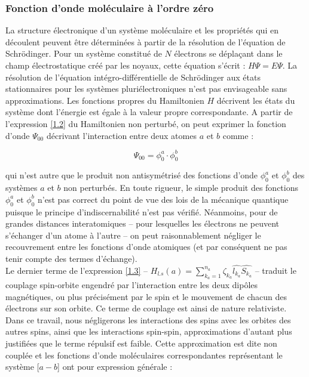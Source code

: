 \documentclass[12pt,a4paper]{book}
\begin{document}
		
	
	\subsubsection{Fonction d'onde moléculaire à l'ordre zéro}
	
	La structure électronique d'un système moléculaire et les propriétés qui en découlent peuvent être déterminées à partir de la résolution de l'équation de Schr\"{o}dinger. Pour un système constitué de $N$ électrons se déplaçant dans le champ électrostatique créé par les noyaux, cette équation s'écrit : $H\Psi = E\Psi$. La résolution de l'équation intégro-différentielle de Schr\"{o}dinger aux états stationnaires pour les systèmes pluriélectroniques n'est pas envisageable sans approximations. Les fonctions propres du Hamiltonien $H$ décrivent les états du système dont l'énergie est égale à la valeur propre correspondante. A partir de l'expression \ref{1.2} du Hamiltonien non perturbé, on peut exprimer la fonction d'onde $\Psi_{00}$ décrivant l'interaction entre deux atomes $a$ et $b$ comme : 
	
	\begin{equation}
	\Psi_{00} = \phi_{0}^{a} \cdot \phi_{0}^{b}
	\end{equation}
	
	\noindent qui n'est autre que le produit non antisymétrisé des fonctions d'onde $\phi_{0}^{a}$ et $\phi_{0}^{b}$ des systèmes $a$ et $b$ non perturbés. En toute rigueur, le simple produit des fonctions $\phi_{0}^{a}$ et $\phi_{0}^{b}$ n'est pas correct du point de vue des lois de la mécanique quantique puisque le principe d'indiscernabilité n'est pas vérifié. Néanmoins, pour de grandes distances interatomiques -- pour lesquelles les électrons ne peuvent s'échanger d'un atome à l'autre -- on peut raisonnablement négliger le recouvrement entre les fonctions d'onde atomiques (et par conséquent ne pas tenir compte des termes d'échange).\\
	
	Le dernier terme de l'expression \ref{1.3} -- $H_{l.s}(a) = \sum_{k_{a}=1}^{n_{a}} \zeta_{k_{a}} \widehat{l_{k_{a}}} \widehat{S_{k_{a}}}$ -- traduit le couplage spin-orbite engendré par l'interaction entre les deux dipôles magnétiques, ou plus précisément par le spin et le mouvement de chacun des électrons sur son orbite. Ce terme de couplage est ainsi de nature relativiste. Dans ce travail, nous négligerons les interactions des spins avec les orbites des autres spins, ainsi que les interactions spin-spin, approximations d'autant plus justifiées que le terme répulsif est faible. Cette approximation est dite \og non couplée \fg{} \cite{fontana1961theory,fontana1962theory} et les fonctions d'onde moléculaires correspondantes représentant le système [$a-b$] ont pour expression générale : 
	
\end{document}

